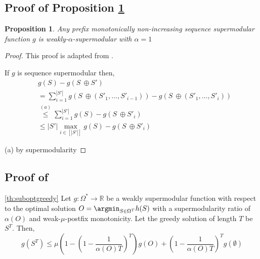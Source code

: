 \documentclass{article} %
\newtheorem{proposition}[theorem]{Proposition}
\begin{document}
\subsection{Proof of Proposition \ref{th:alpha=1}} \label{sec:proofalpha=1}

\begin{proposition} \label{th:alpha=1}
    Any prefix monotonically non-increasing sequence supermodular function $g$ is weakly-$\alpha$-supermodular with $\alpha = 1$
\end{proposition}

\begin{proof}

This proof is adapted from \citet{liberty2017greedy}.

If $g$ is sequence supermodular then,
\begin{align*}
    &g(S) - g(S \ \oplus S' ) \\
    &= \sum_{i = 1}^{|S'|} g(S \ \oplus \left(S'_1, \dots, S'_{i - 1}\right)) - g(S \ \oplus \left(S'_1, \dots, S'_{i}\right)) \\
    &\overset{(a)}{\leq} \sum_{i = 1}^{|S'|} g(S) - g(S \ \oplus  S'_{i}) \\
    &\leq |S'|\max_{i \in [|S'|]} g(S) - g(S \ \oplus  S'_{i})
\end{align*}

(a) by supermodularity


\end{proof}

\subsection{Proof of } \label{sec:proofsuboptgreedy}



\begin{customtheorem}{\ref{th:suboptgreedy}}
    Let $g: \Omega^* \to \mathbb{R}$ be a weakly supermodular function with respect to the optimal solution $O = \argmin_{S \in \Omega^T} h(S)$ with a supermodularity ratio of $\alpha(O)$ and weak-$\mu$-postfix monotonicity. Let the greedy solution of length $T$ be $S^T$. Then,
    \begin{equation*}
        g(S^T) \leq  \mu\left(1 - \left(1 - \frac{1}{\alpha(O) T}\right)^T\right)
        g(O) +  \left(1 - \frac{1}{\alpha(O) T}\right)^Tg(\emptyset)
    \end{equation*}
\end{customtheorem}
\end{document}
